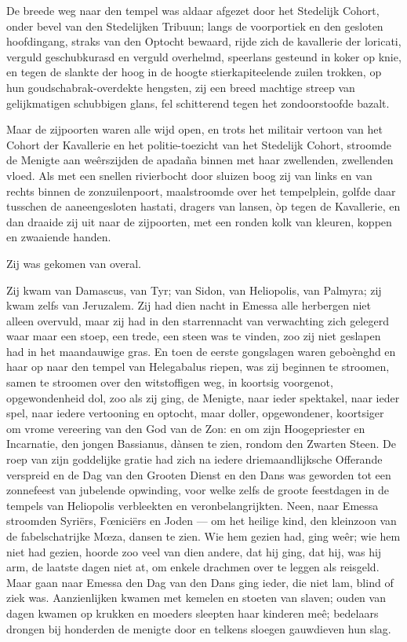 \documentclass[a4paper, 12pt, oneside, dutch]{article}
\begin{document}
De breede weg naar den tempel was aldaar afgezet door het Stedelijk Cohort, onder bevel van den Stedelijken Tribuun; langs de voorportiek en den gesloten hoofdingang, straks van den Optocht bewaard, rijde zich de kavallerie der loricati, verguld geschubkurasd en verguld overhelmd, speerlans gesteund in koker op knie, en tegen de slankte der hoog in de hoogte stierkapiteelende zuilen trokken, op hun goudschabrak-overdekte hengsten, zij een breed machtige streep van gelijkmatigen schubbigen glans, fel schitterend tegen het zondoorstoofde bazalt.

Maar de zijpoorten waren alle wijd open, en trots het militair vertoon van het Cohort der Kavallerie en het politie-toezicht van het Stedelijk Cohort, stroomde de Menigte aan weêrszijden de apadaña binnen met haar zwellenden, zwellenden vloed. Als met een snellen rivierbocht door sluizen boog zij van links en van rechts binnen de zonzuilenpoort, maalstroomde over het tempelplein, golfde daar tusschen de aaneengesloten hastati, dragers van lansen, òp tegen de Kavallerie, en dan draaide zij uit naar de zijpoorten, met een ronden kolk van kleuren, koppen en zwaaiende handen.

Zij was gekomen van overal.

Zij kwam van Damascus, van Tyr; van Sidon, van Heliopolis, van Palmyra; zij kwam zelfs van Jeruzalem. Zij had dien nacht in Emessa alle herbergen niet alleen overvuld, maar zij had in den starrennacht van verwachting zich gelegerd waar maar een stoep, een trede, een steen was te vinden, zoo zij niet geslapen had in het maandauwige gras. En toen de eerste gongslagen waren geboènghd en haar op naar den tempel van Helegabalus riepen, was zij beginnen te stroomen, samen te stroomen over den witstoffigen weg, in koortsig voorgenot, opgewondenheid dol, zoo als zij ging, de Menigte, naar ieder spektakel, naar ieder spel, naar iedere vertooning en optocht, maar doller, opgewondener, koortsiger om vrome vereering van den God van de Zon: en om zijn Hoogepriester en Incarnatie, den jongen Bassianus, dànsen te zien, rondom den Zwarten Steen. De roep van zijn goddelijke gratie had zich na iedere driemaandlijksche Offerande verspreid en de Dag van den Grooten Dienst en den Dans was geworden tot een zonnefeest van jubelende opwinding, voor welke zelfs de groote feestdagen in de tempels van Heliopolis verbleekten en veronbelangrijkten. Neen, naar Emessa stroomden Syriërs, Fœniciërs en Joden --- om het heilige kind, den kleinzoon van de fabelschatrijke Mœza, dansen te zien. Wie hem gezien had, ging weêr; wie hem niet had gezien, hoorde zoo veel van dien andere, dat hij ging, dat hij, was hij arm, de laatste dagen niet at, om enkele drachmen over te leggen als reisgeld. Maar gaan naar Emessa den Dag van den Dans ging ieder, die niet lam, blind of ziek was. Aanzienlijken kwamen met kemelen en stoeten van slaven; ouden van dagen kwamen op krukken en moeders sleepten haar kinderen meê; bedelaars drongen bij honderden de menigte door en telkens sloegen gauwdieven hun slag.
\end{document}

